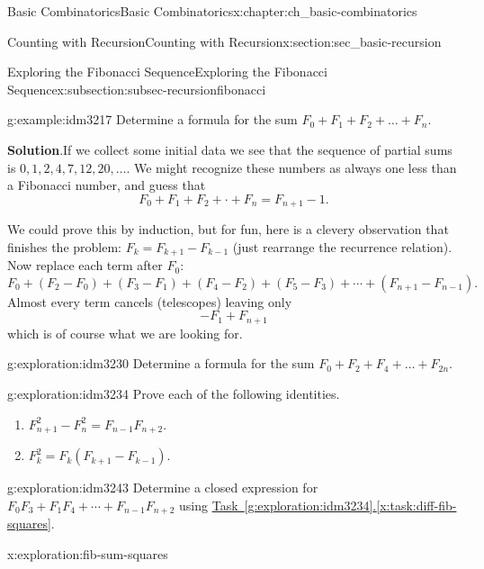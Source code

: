 \documentclass[oneside,10pt,]{book}
\numberwithin{equation}{chapter}
\begin{document}
\begin{chapterptx}{Basic Combinatorics}{}{Basic Combinatorics}{}{}{x:chapter:ch_basic-combinatorics}
\begin{sectionptx}{Counting with Recursion}{}{Counting with Recursion}{}{}{x:section:sec_basic-recursion}
\begin{subsectionptx}{Exploring the Fibonacci Sequence}{}{Exploring the Fibonacci Sequence}{}{}{x:subsection:subsec-recursionfibonacci}
\begin{example}{}{g:example:idm3217}%
Determine a formula for the sum \(F_{0} + F_{1} + F_{2} + \ldots + F_{n}\).%
\par\smallskip%
\noindent\textbf{Solution}.\hypertarget{g:solution:idm3221}{}\quad{}If we collect some initial data we see that the sequence of partial sums is \(0, 1, 2, 4, 7, 12, 20, \ldots\).  We might recognize these numbers as always one less than a Fibonacci number, and guess that%
\begin{equation*}
F_0 + F_1 + F_2 + \cdot + F_n = F_{n+1} - 1.
\end{equation*}
%
\par
We could prove this by induction, but for fun, here is a clevery observation that finishes the problem: \(F_k = F_{k+1} - F_{k-1}\) (just rearrange the recurrence relation).  Now replace each term after \(F_0\):%
\begin{equation*}
F_0 + (F_2 - F_0) + (F_3 - F_1) + (F_4 - F_2) + (F_5 - F_3) + \cdots + (F_{n+1} - F_{n-1})\text{.}
\end{equation*}
Almost every term cancels (telescopes) leaving only%
\begin{equation*}
-F_1 + F_{n+1}
\end{equation*}
which is of course what we are looking for.%
\end{example}
\begin{exploration}{}{g:exploration:idm3230}%
Determine a formula for the sum  \(F_{0} + F_{2} + F_{4} + \ldots + F_{2n}\).%
\end{exploration}
\begin{exploration}{}{g:exploration:idm3234}%
Prove each of the following identities.%
\begin{enumerate}[font=\bfseries,label=(\alph*),ref=\alph*]
\item\label{x:task:diff-fib-squares}\(F_{n + 1}^{2} - F_{n}^{2} = F_{n - 1}F_{n + 2}\).%
\item\label{x:task:fib-squares}\(F_{k}^{2} = F_{k}(F_{k + 1} - F_{k - 1})\).%
\end{enumerate}
\end{exploration}
\begin{exploration}{}{g:exploration:idm3243}%
Determine a closed expression for \(F_{0}F_{3}
+ F_{1}F_{4} + \cdots +
F_{n-1}F_{n+2}\) using \hyperref[x:task:diff-fib-squares]{Task~\ref{g:exploration:idm3234}.\ref{x:task:diff-fib-squares}}.%
\end{exploration}
\begin{exploration}{}{x:exploration:fib-sum-squares}%

\end{exploration}
\end{subsectionptx}
\end{sectionptx}
\end{chapterptx}
\end{document}
